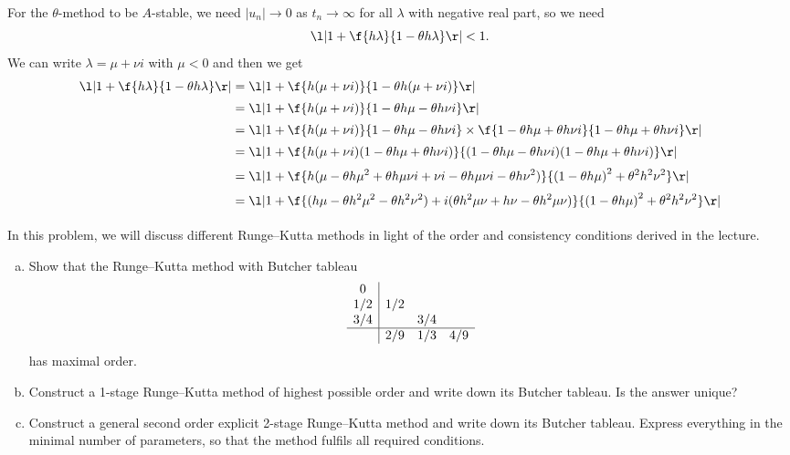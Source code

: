 \documentclass[a4paper]{article}
\begin{document}
For the $\theta$-method to be $A$-stable, we need $|u_n| \to 0$ as $t_n \to \infty$ for all $\lambda$ with negative real part, so we need \[
\l| 1 + \f{h \lambda}{1 - \theta h \lambda} \r| < 1.
\] We can write $\lambda = \mu + \nu i$ with $\mu < 0$ and then we get
\begin{align*}
\l| 1 + \f{h \lambda}{1 - \theta h \lambda} \r| &= \l| 1 + \f{h (\mu + \nu i)}{1 - \theta h (\mu + \nu i)} \r| \\[0.5ex]
%
&= \l| 1 + \f{h (\mu + \nu i)}{1 - \theta h \mu - \theta h \nu i} \r| \\[0.5ex]
%
&= \l| 1 + \f{h (\mu + \nu i)}{1 - \theta h \mu - \theta h \nu i} \times \f{1 - \theta h \mu + \theta h \nu i}{1 - \theta h \mu + \theta h \nu i} \r| \\[0.5ex]
%
&= \l| 1 + \f{h (\mu + \nu i) (1 - \theta h \mu + \theta h \nu i)}{(1 - \theta h \mu - \theta h \nu i) (1 - \theta h \mu + \theta h \nu i)} \r| \\[0.5ex]
%
&= \l| 1 + \f{h (\mu - \theta h \mu^2 + \theta h \mu \nu i + \nu i - \theta h \mu \nu i - \theta h \nu^2)}{{(1 - \theta h \mu)}^2 + \theta^2 h^2 \nu^2} \r| \\[0.5ex]
%
&= \l| 1 + \f{(h \mu - \theta h^2 \mu^2  - \theta h^2 \nu^2) + i (\theta h^2 \mu \nu + h \nu - \theta h^2 \mu \nu)}{{(1 - \theta h \mu)}^2 + \theta^2 h^2 \nu^2} \r| \\[0.5ex]
\end{align*}



\begin{questionbody}
In this problem, we will discuss different Runge--Kutta methods in light of the order and consistency conditions derived in the lecture. %
\begin{enumerate}[(a)]
\item Show that the Runge--Kutta method with Butcher tableau \[ %
\begin{array}{c|ccc} %
0 \\
1/2 & 1/2 \\
3/4 & & 3/4 \\
\hline %
& 2/9 & 1/3 & 4/9
\end{array}
\] has maximal order.

\item Construct a 1-stage Runge--Kutta method of highest possible order and write down its Butcher tableau. Is the answer unique? %

\item Construct a general second order explicit 2-stage Runge--Kutta method and write down its Butcher tableau. Express everything in the minimal number of parameters, so that the method fulfils all required conditions. %
\end{enumerate}
\end{questionbody}
\end{document}
